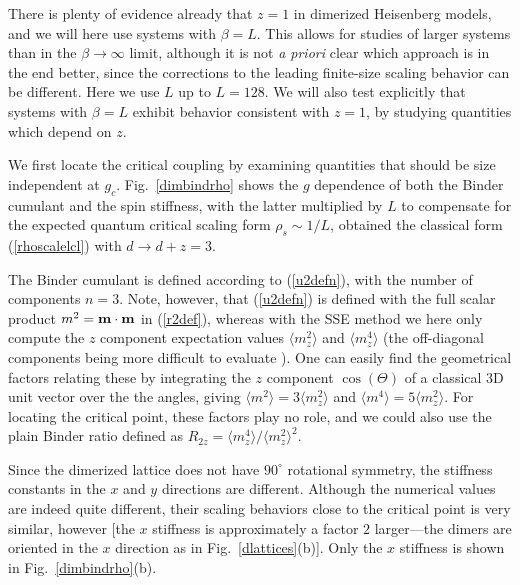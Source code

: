 \documentclass[draft,numberedheadings]{aipproc}
\begin{document}
There is plenty of evidence already that $z=1$ in dimerized Heisenberg models, and we will here use systems with $\beta=L$. This allows for studies 
of larger systems than in the $\beta\to \infty$ limit, although it is not {\it a priori} clear which approach is in the end better, since the corrections 
to the leading finite-size scaling behavior can be different. Here we use $L$ up to $L=128$. We will also test explicitly that systems with $\beta=L$ 
exhibit behavior consistent with $z=1$, by studying quantities which depend on $z$.

We first locate the critical coupling by examining quantities that should be size independent at $g_c$. Fig.~\ref{dimbindrho} shows the $g$ dependence of 
both the Binder cumulant and the spin stiffness, with the latter multiplied by $L$ to compensate for the expected quantum critical scaling form $\rho_s \sim 1/L$, 
obtained the classical form (\ref{rhoscalelcl}) with $d \to d+z=3$. 

The Binder cumulant is defined according to (\ref{u2defn}), with the number of components $n=3$. Note, however, that (\ref{u2defn}) is defined with the full 
scalar product $m^2={\bf m}\cdot {\bf m}$ in (\ref{r2def}), whereas with the SSE method we here only compute the $z$ component expectation values $\langle m_z^2\rangle$ 
and $\langle m_z^4\rangle$ (the off-diagonal components being more difficult to evaluate \cite{dorneich01}). One can easily find the geometrical factors relating 
these by integrating the $z$ component $\cos(\Theta)$ of a classical 3D unit vector over the the angles, giving $\langle m^2\rangle=3\langle m_z^2\rangle$ and 
$\langle m^4\rangle=5\langle m_z^2\rangle$. For locating the critical point, these factors play no role, and we could also use the plain Binder ratio defined 
as $R_{2z}=\langle m_z^4\rangle/\langle m_z^2\rangle^2$. 

Since the dimerized lattice does not have $90^\circ$ rotational symmetry, the stiffness constants in the $x$ and $y$ directions are different. Although the 
numerical values are indeed quite different, their scaling behaviors close to the critical point is very similar, however [the $x$ stiffness is approximately 
a factor $2$ larger---the dimers are oriented in the $x$ direction as in Fig.~\ref{dlattices}(b)]. Only the $x$ stiffness is shown in Fig.~\ref{dimbindrho}(b). 
\end{document}
